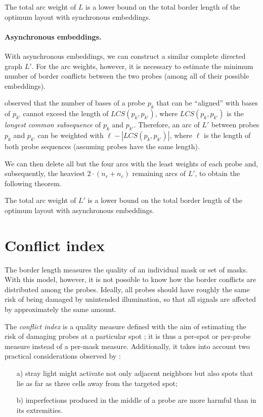 \begin{theorem}
  \label{thm:sync_lb}
  The total arc weight of $L$ is a lower bound on the total border length of
  the optimum layout with synchronous embeddings.
\end{theorem}

\paragraph{Asynchronous embeddings.}
With asynchronous embeddings, we can construct a similar complete directed graph
$L'$. For the arc weights, however, it is necessary to estimate the minimum
number of border conflicts between the two probes (among all of their possible
embeddings).

\citet{Kahng2002} observed that the number of bases of a probe $p_k$ that can
be ``aligned'' with bases of $p_{k'}$ cannot exceed the length of $LCS(p_k,p_{k'})$,
where $LCS(p_k,p_{k'})$ is the
\emph{longest common subsequence} of $p_k$ and $p_{k'}$. Therefore, an arc of $L'$
between probes $p_k$ and $p_{k'}$ can be weighted with $\ell - |LCS(p_k,p_{k'})|$,
where $\ell$ is the length of both probe sequences (assuming probes have the same length).

We can then delete all but the four arcs with the least weights of each probe
and, subsequently, the heaviest $2 \cdot (n_r + n_c)$ remaining arcs of $L'$, to
obtain the following theorem.

\begin{theorem}
  \label{thm:async_lb}
  The total arc weight of $L'$ is a lower bound on the total border length of
  the optimum layout with asynchronous embeddings.
\end{theorem}

\section{Conflict index}
\label{sec:mlp_conflict_index}

The border length measures the quality of an individual mask or set of masks.
With this model, however, it is not possible to know how the border conflicts
are distributed among the probes. Ideally, all probes should have roughly the
same risk of being damaged by unintended illumination, so that all signals are
affected by approximately the same amount.

The \emph{conflict index} is a quality measure defined with the aim of
estimating the risk of damaging probes at a particular spot
\citep{Carvalho2006a}; it is thus a per-spot or per-probe measure instead of a
per-mask measure. Additionally, it takes into account two practical
considerations observed by \citet{Kahng2003}:
\begin{itemize}
\item[a)] stray light might activate not only adjacent neighbors but also spots
  that lie as far as three cells away from the targeted spot;
\item[b)] imperfections produced in the middle of a probe are more harmful than
  in its extremities.
\end{itemize}

